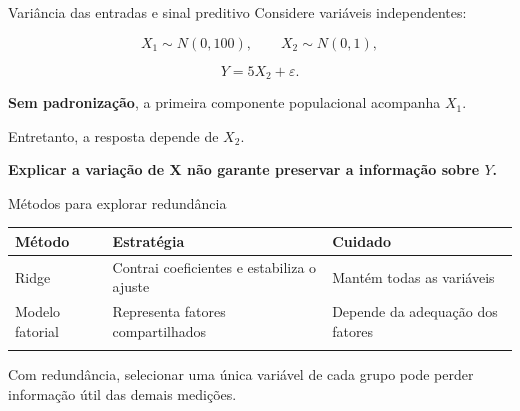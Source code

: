 \documentclass[
  10pt,
  ignorenonframetext,
  aspectratio=169,
  brazilian,
]{beamer}
\newcounter{none} %
\begin{document}
\begin{frame}{Variância das entradas e sinal preditivo}
\protect{}\label{variuxe2ncia-das-entradas-e-sinal-preditivo}
Considere variáveis independentes:

\[
X_1\sim N(0,100),\qquad X_2\sim N(0,1),
\]

\[
Y=5X_2+\varepsilon.
\]

\textbf{Sem padronização}, a primeira componente populacional acompanha
\(X_1\).

Entretanto, a resposta depende de \(X_2\).

\textbf{Explicar a variação de \(\mathbf X\) não garante preservar a
informação sobre \(Y\).}

\end{frame}

\begin{frame}{Métodos para explorar redundância}
\protect{}\label{muxe9todos-para-explorar-redunduxe2ncia}
{\def\LTcaptype{none} %
\begin{longtable}[]{@{}
  >{\raggedright\arraybackslash}p{}
  >{\raggedright\arraybackslash}p{}
  >{\raggedright\arraybackslash}p{}@{}}
\toprule\noalign{}
\begin{minipage}[b]{\linewidth}\raggedright
Método
\end{minipage} & \begin{minipage}[b]{\linewidth}\raggedright
Estratégia
\end{minipage} & \begin{minipage}[b]{\linewidth}\raggedright
Cuidado
\end{minipage} \\
\midrule\noalign{}
\endhead
Ridge & Contrai coeficientes e estabiliza o ajuste & Mantém todas as
variáveis \\
Modelo fatorial & Representa fatores compartilhados & Depende da
adequação dos fatores \\
\bottomrule\noalign{}
\end{longtable}
}

Com redundância, selecionar uma única variável de cada grupo pode perder
informação útil das demais medições.
\end{frame}
\end{document}
